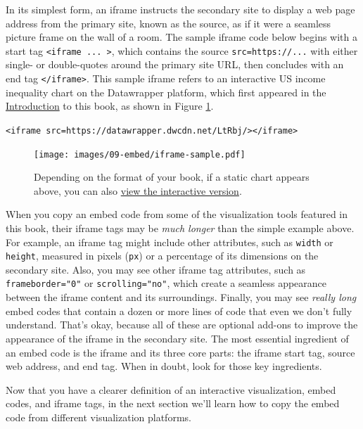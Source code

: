 \documentclass[
  english,
]{book}
\begin{document}
In its simplest form, an iframe instructs the secondary site to display a web page address from the primary site, known as the source, as if it were a seamless picture frame on the wall of a room. The sample iframe code below begins with a start tag \texttt{\textless{}iframe\ ...\ \textgreater{}}, which contains the source \texttt{src=\textquotesingle{}https://...\textquotesingle{}} with either single- or double-quotes around the primary site URL, then concludes with an end tag \texttt{\textless{}/iframe\textgreater{}}. This sample iframe refers to an interactive US income inequality chart on the Datawrapper platform, which first appeared in the \href{introduction.html}{Introduction} to this book, as shown in Figure \ref{fig:iframe-sample}.

\texttt{\textless{}iframe\ src=\textquotesingle{}https://datawrapper.dwcdn.net/LtRbj/\textquotesingle{}\textgreater{}\textless{}/iframe\textgreater{}}



\begin{figure}
\centering
\texttt{[image: images/09-embed/iframe-sample.pdf]}
\caption{\label{fig:iframe-sample}Depending on the format of your book, if a static chart appears above, you can also \href{https://datawrapper.dwcdn.net/LtRbj/}{view the interactive version}.}
\end{figure}

When you copy an embed code from some of the visualization tools featured in this book, their iframe tags may be \emph{much longer} than the simple example above. For example, an iframe tag might include other attributes, such as \texttt{width} or \texttt{height}, measured in pixels (\texttt{px}) or a percentage of its dimensions on the secondary site. Also, you may see other iframe tag attributes, such as \texttt{frameborder="0"} or \texttt{scrolling="no"}, which create a seamless appearance between the iframe content and its surroundings. Finally, you may see \emph{really long} embed codes that contain a dozen or more lines of code that even we don't fully understand. That's okay, because all of these are optional add-ons to improve the appearance of the iframe in the secondary site. The most essential ingredient of an embed code is the iframe and its three core parts: the iframe start tag, source web address, and end tag. When in doubt, look for those key ingredients.

Now that you have a clearer definition of an interactive visualization, embed codes, and iframe tags, in the next section we'll learn how to copy the embed code from different visualization platforms.
\end{document}
